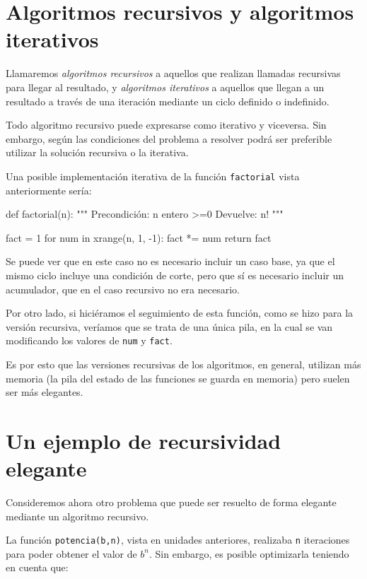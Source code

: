\section{Algoritmos recursivos y algoritmos iterativos}

Llamaremos {\it algoritmos recursivos} a aquellos que realizan llamadas
recursivas para llegar al resultado, y {\it algoritmos iterativos} a
aquellos que llegan a un resultado a través de una iteración mediante un
ciclo definido o indefinido.

Todo algoritmo recursivo puede expresarse como iterativo y viceversa.  Sin
embargo, según las condiciones del problema a resolver podrá ser preferible
utilizar la solución recursiva o la iterativa.

Una posible implementación iterativa de la función \lstinline!factorial!
vista anteriormente sería:

\begin{codigo-python-sn}
def factorial(n):
    """ Precondición: n entero >=0
        Devuelve: n! """

    fact = 1
    for num in xrange(n, 1, -1):
        fact *= num
    return fact
\end{codigo-python-sn}

Se puede ver que en este caso no es necesario incluir un caso base, ya que
el mismo ciclo incluye una condición de corte, pero que sí es necesario
incluir un acumulador, que en el caso recursivo no era necesario.

Por otro lado, si hiciéramos el seguimiento de esta función, como se hizo
para la versión recursiva, veríamos que se trata de una única pila, en la
cual se van modificando los valores de \lstinline!num! y \lstinline!fact!.

Es por esto que las versiones recursivas de los algoritmos, en general,
utilizan más memoria (la pila del estado de las funciones se guarda en
memoria) pero suelen ser más elegantes.

\section{Un ejemplo de recursividad elegante}

Consideremos ahora otro problema que puede ser resuelto de forma elegante
mediante un algoritmo recursivo.

La función \lstinline!potencia(b,n)!, vista en unidades anteriores,
realizaba \lstinline!n! iteraciones para poder obtener el valor de $b^n$.
Sin embargo, es posible optimizarla teniendo en cuenta que: \\

